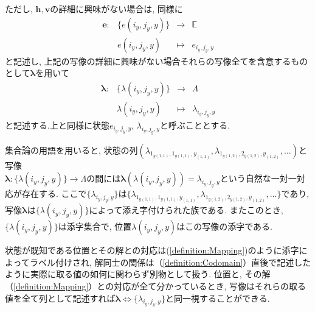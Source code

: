 \begin{definition}[写像$\bm{p}$, $\bm{c}$, $\bm{h}$, $\bm{v}$]
  ただし, $\bm{h},\bm{v}$の詳細に興味がない場合は, 同様に
  \begin{equation*}
    \begin{array}{rccc}
      \bm{e}\colon & \{e(i_y,j_y,y)\} & \longrightarrow & \mathbb{E}    \\
                   & e(i_y,j_y,y)     & \longmapsto     & e_{i_y,j_y,y}
    \end{array}
  \end{equation*}
  と記述し, 上記の写像の詳細に興味がない場合それらの写像全てを含意するものとして$\bm{\lambda}$を用いて
  \begin{equation*}
    \begin{array}{rccc}
      \bm{\lambda}\colon & \{\lambda(i_y,j_y,y)\} & \longrightarrow & \Lambda             \\
                         & \lambda(i_y,j_y,y)     & \longmapsto     & \lambda_{i_y,j_y,y}
    \end{array}
  \end{equation*}
  と記述する.上と同様に状態$e_{i_y,j_y,y}$, $\lambda_{i_y,j_y,y}$と呼ぶこととする.
\end{definition}
集合論の用語を用いると, 状態の列$(\lambda_{1_{y(1,1)},1_{y(1,1)},y_{(1,1)}}, \lambda_{1_{y(1,2)},2_{y(1,2)},y_{(1,2)}},...)$と写像\\
$\bm{\lambda}\colon \{\lambda(i_y,j_y,y)\} \longrightarrow \Lambda$の間には$\bm{\lambda}(\lambda(i_y,j_y,y))=\lambda_{i_y,j_y,y}$という自然な一対一対応が存在する.
ここで$\{\lambda_{i_y,j_y,y}\}$は$\{\lambda_{1_{y(1,1)},1_{y(1,1)},y_{(1,1)}}, \lambda_{1_{y(1,2)},2_{y(1,2)},y_{(1,2)}},...\}$であり, 写像$\bm{\lambda}$は$\{\lambda(i_y,j_y,y)\}$によって添え字付けられた族である. またこのとき, $\{\lambda(i_y,j_y,y)\}$は添字集合で, 位置$\lambda(i_y,j_y,y)$はこの写像の添字である.

状態が既知である位置とその解との対応は(\cref{definition:Mapping})のように添字によってラベル付けされ, 解同士の関係は（\cref{definition:Codomain}）直後で記述したように実際に取る値の如何に関わらず別物として扱う.
位置と, その解（\cref{definition:Mapping}）との対応が全て分かっているとき, 写像はそれらの取る値を全て列として記述すれば$\bm{\lambda}\Leftrightarrow \{\lambda_{i_y,j_y,y}\}$と同一視することができる.

